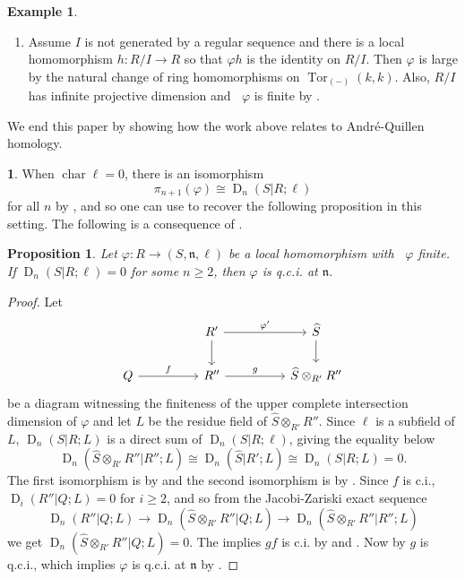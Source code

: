 \documentclass{amsart}
\newtheorem{proposition}[theorem]{Proposition}
\theoremstyle{definition}
\newtheorem{example}[theorem]{Example}
\newtheorem{chunk}[theorem]{}
\DeclareMathOperator{\tor}{Tor}
\DeclareMathOperator{\uppercidim}{CI^{*}dim}
\newcommand{\daq}[4]{\operatorname{D}_{#1}(#2|#3;#4)}
\newcommand{\n}{\mathfrak{n}}
\newcommand{\Char}{\operatorname{char}}
\begin{document}
\begin{example}
\begin{enumerate}
\item Assume $I$ is not generated by a regular sequence and there is a local homomorphism $h\colon R/I\rightarrow R$ so that $\varphi h$ is the identity on $R/I$. Then $\varphi$ is large by the natural change of ring homomorphisms on $\tor_{(-)}(k,k)$. %
Also, $R/I$ has infinite projective dimension and $\uppercidim{\varphi}$ is finite by .
\end{enumerate}
\end{example}

We end this paper by showing how the work above relates to Andr\'e-Quillen homology.

\begin{chunk}
    When $\Char{\ell}=0$, there is an isomorphism
    \[\pi_{n+1}(\varphi)\cong \daq{n}{S}{R}{\ell}\]
    for all $n$ by \cite{Quillen:1970, Avramov/Halperin:1987}, and so one can use  to recover the following proposition in this setting. The following is a consequence of \cite[Theorem A]{Briggs/Iyengar:2020}.  
\end{chunk}

\begin{proposition} \label{P_QuillenConjecture} Let $\varphi\colon R\rightarrow (S,\n,\ell)$ be a local homomorphism with $\uppercidim{\varphi}$ finite. If $\daq{n}{S}{R}{\ell}=0$ for some $n\geq 2$, then $\varphi$ is q.c.i. at $\n$.
\end{proposition}

\begin{proof}
Let 
\[\begin{tikzcd}
	&& {R'} && {\widehat{S}} \\
	Q && {R''} && {\widehat{S}\otimes_{R'}R''}
	\arrow["{\varphi'}", from=1-3, to=1-5]
	\arrow[from=1-3, to=2-3]
	\arrow[from=1-5, to=2-5]
	\arrow["f", from=2-1, to=2-3]
	\arrow["g", from=2-3, to=2-5]
\end{tikzcd}\]
be a diagram witnessing the finiteness of the upper complete intersection dimension of $\varphi$ and let $L$ be the residue field of $\widehat{S}\otimes_{R'}R''$. Since $\ell$ is a subfield of $L$, $\daq{n}{S}{R}{L}$ is a direct sum of $\daq{n}{S}{R}{\ell}$, giving the equality below
\[\daq{n}{\widehat{S}\otimes_{R'}R''}{R''}{L} \cong \daq{n}{\widehat{S}}{R'}{L} \cong \daq{n}{S}{R}{L} = 0.\]
The first isomorphism is by \cite[6.3]{Iyengar:2007} and the second isomorphism is by \cite[Lemma 1.7]{Avramov:1999}. Since $f$ is c.i., $\daq{i}{R''}{Q}{L}=0$ for $i\geq 2$, and so from the Jacobi-Zariski exact sequence \cite[Theorem 5.1]{Andre:1974}
\[\daq{n}{R''}{Q}{L}\rightarrow \daq{n}{\widehat{S}\otimes_{R'}R''}{Q}{L}\rightarrow \daq{n}{\widehat{S}\otimes_{R'}R''}{R''}{L}\]
we get $\daq{n}{\widehat{S}\otimes_{R'}R''}{Q}{L} = 0$. The implies $gf$ is c.i. by \cite[Theorem A]{Briggs/Iyengar:2020} and \cite[Proposition 4.57]{Andre:1974}. Now by \cite[8.9]{Avramov/Henriques/Sega:2013} $g$ is q.c.i., which implies $\varphi$ is q.c.i. at $\n$ by \cite[8.7]{Avramov/Henriques/Sega:2013}.
\end{proof}
\end{document}
